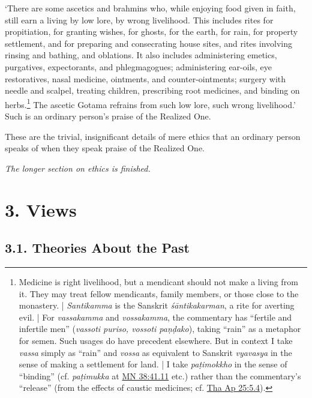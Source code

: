 \documentclass[12pt,openany]{book}%
\newcommand*{\scendsection}[1]{\begin{Center}\begin{small}\textit{#1}\end{small}\end{Center}\addvspace{1em}}
\begin{document}
‘There are some ascetics and brahmins who, while enjoying food given in faith, still earn a living by low lore, by wrong livelihood. This includes rites for propitiation, for granting wishes, for ghosts, for the earth, for rain, for property settlement, and for preparing and consecrating house sites, and rites involving rinsing and bathing, and oblations. It also includes administering emetics, purgatives, expectorants, and phlegmagogues; administering ear-oils, eye restoratives, nasal medicine, ointments, and counter-ointments; surgery with needle and scalpel, treating children, prescribing root medicines, and binding on herbs.\footnote{Medicine is right livelihood, but a mendicant should not make a living from it. They may treat fellow mendicants, family members, or those close to the monastery. | \textit{Santikamma} is the Sanskrit \textit{\textsanskrit{śāntikakarman}}, a rite for averting evil. | For \textit{vassakamma} and \textit{vossakamma}, the commentary has “fertile and infertile men” (\textit{vassoti puriso, vossoti \textsanskrit{paṇḍako}}), taking “rain” as a metaphor for semen. Such usages do have precedent elsewhere. But in context I take \textit{vassa} simply as “rain” and \textit{vossa} as equivalent to Sanskrit \textit{vyavasya} in the sense of making a settlement for land. | I take \textit{\textsanskrit{paṭimokkho}} in the sense of “binding” (cf. \textit{\textsanskrit{paṭimukka}} at \href{https://suttacentral.net/mn38/en/sujato\#41.11}{MN 38:41.11} etc.) rather than the commentary’s “release” (from the effects of caustic medicines; cf. \href{https://suttacentral.net/tha-ap25/en/sujato\#5.4}{Tha Ap 25:5.4}). } The ascetic Gotama refrains from such low lore, such wrong livelihood.’ Such is an ordinary person’s praise of the Realized One. 

These are the trivial, insignificant details of mere ethics that an ordinary person speaks of when they speak praise of the Realized One. 

\scendsection{The longer section on ethics is finished. }

\section*{3. Views }

\subsection*{3.1. Theories About the Past }
\end{document}
